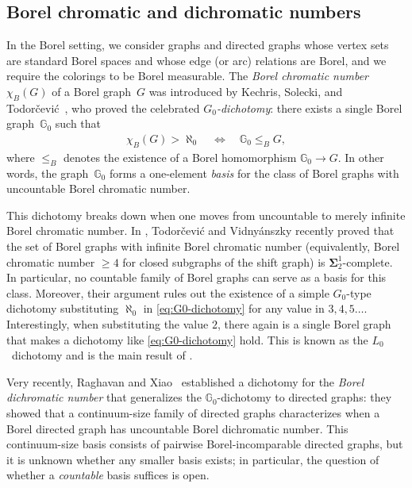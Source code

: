\documentclass[12pt]{article}
\begin{document}
\subsection{Borel chromatic and dichromatic numbers}

In the Borel setting, we consider graphs and directed graphs whose vertex sets are standard Borel spaces and whose edge (or arc) relations are Borel, and we require the colorings to be Borel measurable.
The \emph{Borel chromatic number} $\chi_B(G)$ of a Borel graph~$G$ was introduced by Kechris, Solecki, and Todorčević~\cite{kechris1999borel}, who proved the celebrated \emph{$G_0$-dichotomy}: there exists a single Borel graph~$\mathbb{G}_0$ such that
\begin{align}\label{eq:G0-dichotomy}
    \chi_B(G) > \aleph_0\quad
    \Longleftrightarrow\quad
    \mathbb{G}_0 \leq_B G,
\end{align}
where $\leq_B$ denotes the existence of a Borel homomorphism $\mathbb{G}_0\to G$.
In other words, the graph~$\mathbb{G}_0$ forms a one-element \emph{basis} for the class of Borel graphs with uncountable Borel chromatic number.

This dichotomy breaks down when one moves from uncountable to merely infinite Borel chromatic number.
In \cite{Todorcevic_2021_ComplexProbBorel}, Todorčević and Vidnyánszky recently proved that the set of Borel graphs with infinite Borel chromatic number (equivalently, Borel chromatic number $\geq 4$ for closed subgraphs of the shift graph) is $\mathbf\Sigma^1_2$-complete.
In particular, no countable family of Borel graphs can serve as a basis for this class.
Moreover, their argument rules out the existence of a simple $G_0$-type dichotomy substituting $\aleph_0$ in \eqref{eq:G0-dichotomy} for any value in $3,4,5\dots$.
Interestingly, when substituting the value $2$, there again is a single Borel graph that makes a dichotomy like \eqref{eq:G0-dichotomy} hold.
This is known as the $L_0$~dichotomy and is the main result of \cite{L0paper}.

Very recently, Raghavan and Xiao~\cite{RaghavanXiao2024} established a dichotomy for the \emph{Borel dichromatic number} that generalizes the $\mathbb{G}_0$-dichotomy to directed graphs: they showed that a continuum-size family of directed graphs characterizes when a Borel directed graph has uncountable Borel dichromatic number.
This continuum-size basis consists of pairwise Borel-incomparable directed graphs, but it is unknown whether any smaller basis exists; in particular, the question of whether a \emph{countable} basis suffices is open.
\end{document}
